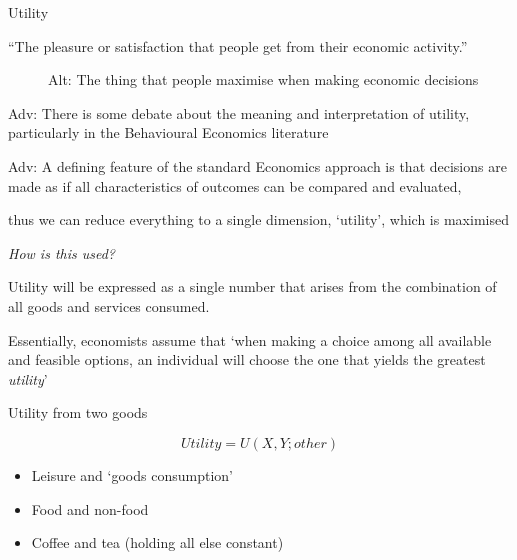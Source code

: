 \documentclass[table]{beamer}
\providecommand{\tightlist}{%
  \setlength{\itemsep}{0pt}\setlength{\parskip}{0pt}}
\begin{document}
\begin{frame}{Utility}
\protect\hypertarget{utility}{}

\begin{description}
\tightlist
\item[Utility]
``The pleasure or satisfaction that people get from their economic
activity.''
\end{description}

\begin{description}
\item[ \bigskip]
Alt: The thing that people maximise when making economic decisions
\end{description}

Adv: There is some debate about the meaning and interpretation of
utility, particularly in the Behavioural Economics literature

Adv: A defining feature of the standard Economics approach is that
decisions are made as if all characteristics of outcomes can be compared
and evaluated,

thus we can reduce everything to a single dimension, `utility', which is
maximised

\end{frame}

\begin{frame}

\emph{How is this used?}

\bigskip

Utility will be expressed as a single number that arises from the
combination of all goods and services consumed.

\bigskip

Essentially, economists assume that `when making a choice among all
available and feasible options, an individual will choose the one that
yields the greatest \emph{utility}'

\begin{block}{Utility from two goods}

\[Utility = U(X,Y; other)\]

\begin{itemize}
\tightlist
\item
  Leisure and `goods consumption'
\item
  Food and non-food
\item
  Coffee and tea (holding all else constant)
\end{itemize}

\end{block}

\end{frame}
\end{document}
